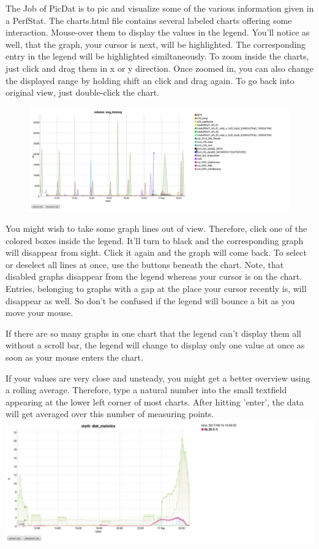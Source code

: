 \documentclass[8pt]{extarticle}
\begin{document}
The Job of PicDat is to pic and visualize some of the various information given in a PerfStat. The charts.html file contains several labeled charts offering some interaction. Mouse-over them to display the values in the legend. You'll notice as well, that the graph, your cursor is next, will be highlighted. The corresponding entry in the legend will be highlighted similtaneously.
To zoom inside the charts, just click and drag them in x or y direction. Once zoomed in, you can also change the displayed range by holding shift an click and drag again. To go back into original view, just double-click the chart.
\begin{figure}
    \centering
    \includegraphics[scale=0.2]{PicDat_deselect}
\end{figure}
You might wish to take some graph lines out of view. Therefore, click one of the colored boxes inside the legend. It'll turn to black and the corresponding graph will disappear from sight. Click it again and the graph will come back. To select or deselect all lines at once, use the buttons beneath the chart.
Note, that disabled graphs disappear from the legend whereas your cursor is on the chart. Entries, belonging to graphs with a gap at the place your cursor recently is, will disappear as well. So don't be confused if the legend will bounce a bit as you move your mouse. 
\bigskip
\bigskip
\bigskip

If there are so many graphs in one chart that the legend can't display them all without a scroll bar, the legend will change to display only one value at once as soon as your mouse enters the chart.
 
If your values are very close and unsteady, you might get a better overview using a rolling average. Therefore, type a natural number into the small textfield appearing at the lower left corner of most charts. After hitting 'enter', the data will get averaged over this number of measuring points.
\includegraphics[scale=0.3]{PicDat_roller}
\bigskip
\end{document}
